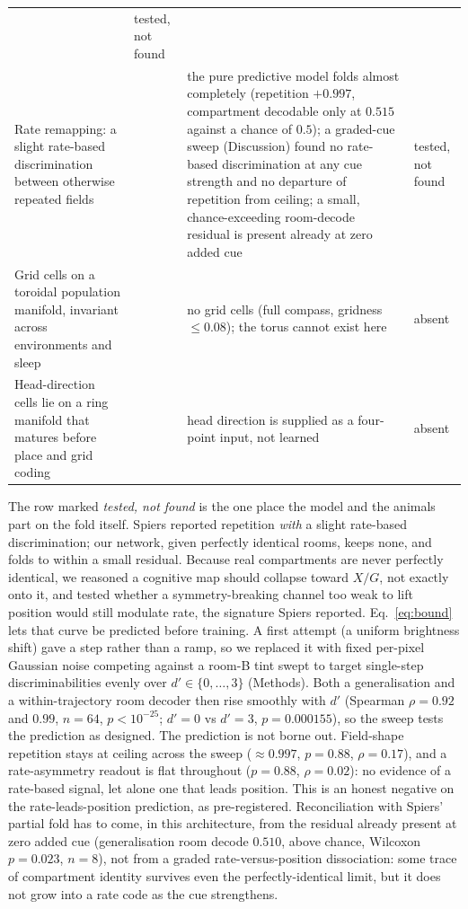 \begin{table}[t]
\begin{tabular}{p{}p{}p{}p{}}
& tested, not found \\[4pt]
Rate remapping: a slight rate-based discrimination between otherwise repeated fields
& \citet{spiers2015} & the pure predictive model folds almost completely (repetition $+0.997$,
compartment decodable only at $0.515$ against a chance of $0.5$); a graded-cue sweep (Discussion) found no
rate-based discrimination at any cue strength and no departure of repetition from ceiling; a
small, chance-exceeding room-decode residual is present already at zero added cue
& tested, not found \\[4pt]
Grid cells on a toroidal population manifold, invariant across environments and sleep
& \citet{gardner2022toroidal} & no grid cells (full compass, gridness $\le 0.08$); the torus cannot exist here
& absent \\[4pt]
Head-direction cells lie on a ring manifold that matures before place and grid coding
& \citet{taube1990, langston2010} & head direction is supplied as a four-point input, not learned
& absent \\
\bottomrule
\end{tabular}
\end{table}

The row marked \emph{tested, not found} is the one place the model and the animals part on the fold
itself. Spiers reported repetition \emph{with} a slight rate-based discrimination; our network, given
perfectly identical rooms, keeps none, and folds to within a small residual. Because real compartments
are never perfectly identical, we reasoned a cognitive map should collapse toward $X/G$, not exactly
onto it, and tested whether a symmetry-breaking channel too weak to lift position would still modulate
rate, the signature Spiers reported. Eq.~\ref{eq:bound} lets that curve be predicted before training. A first
attempt (a uniform brightness shift) gave a step rather than a ramp, so we replaced it with fixed
per-pixel Gaussian noise competing against a room-B tint swept to target single-step discriminabilities
evenly over $d' \in \{0,\dots,3\}$ (Methods). Both a generalisation and a within-trajectory room decoder
then rise smoothly with $d'$ (Spearman $\rho = 0.92$ and $0.99$, $n = 64$, $p < 10^{-25}$; $d'=0$ vs
$d'=3$, $p = 0.000155$), so the sweep tests the prediction as designed. The prediction is not borne out.
Field-shape repetition stays at ceiling across the sweep ($\approx 0.997$, $p = 0.88$, $\rho = 0.17$),
and a rate-asymmetry readout is flat throughout ($p = 0.88$, $\rho = 0.02$): no evidence of a rate-based
signal, let alone one that leads position. This is an honest negative on the rate-leads-position
prediction, as pre-registered. Reconciliation with Spiers' partial fold has to come, in this
architecture, from the residual already present at zero added cue (generalisation room decode $0.510$,
above chance, Wilcoxon $p = 0.023$, $n = 8$), not from a graded rate-versus-position dissociation: some
trace of compartment identity survives even the perfectly-identical limit, but it does not grow into a
rate code as the cue strengthens.

